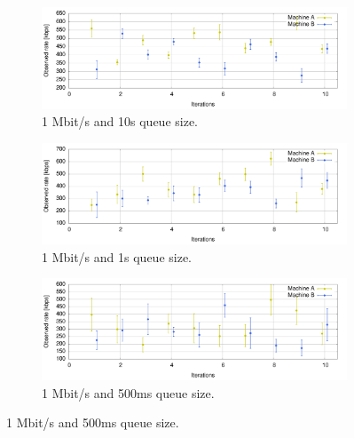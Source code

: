 \begin{figure}[htp]
        \centering
        \begin{subfigure}[b]{1\textwidth}
                \centering
                \includegraphics[width=\textwidth]{./figures/1mb_10s_mean_deviation_bw.pdf}
      \caption[1 Mbit/s and 10s queue size]{1 Mbit/s and 10s queue size.}
	\label{fig:1mb_10s_mean_deviation_bw}
        \end{subfigure}
        \qquad

        \begin{subfigure}[b]{1\textwidth}
                \centering
                \includegraphics[width=\textwidth]{./figures/1mb_1s_mean_deviation_bw.pdf}
      \caption[1 Mbit/s and 1s queue size]{1 Mbit/s and 1s queue size.}
	\label{fig:1mb_1s_mean_deviation_bw}
        \end{subfigure}
        
        \begin{subfigure}[b]{1\textwidth}
                \centering
                \includegraphics[width=\textwidth]{./figures/1mb_05s_mean_deviation_bw.pdf}
      \caption[1 Mbit/s and 500ms queue size]{1 Mbit/s and 500ms queue size.}
	\label{fig:1mb_500ms_mean_deviation_bw}
        \end{subfigure}
        \qquad


\end{figure}
